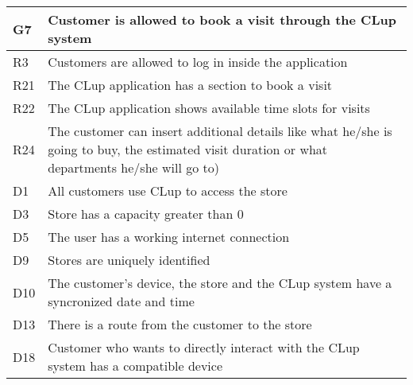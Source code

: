 \begin{center}
    {\renewcommand{\arraystretch}{1.5}
    \begin{longtable}{L{2cm}L{12cm}}
        \hline
        \textbf{G7} & \textbf{Customer is allowed to book a visit through the CLup system} \\
        \hline
         R3 & Customers are allowed to log in inside the application \\
        \hline
         R21 & The CLup application has a section to book a visit \\
        \hline
         R22 & The CLup application shows available time slots for visits \\
        \hline
         R24 & The customer can insert additional details like what he/she is going to buy, the estimated visit duration or what departments he/she will go to) \\
        \hline
         D1 & All customers use CLup to access the store \\
        \hline
         D3 & Store has a capacity greater than 0 \\
        \hline
         D5 & The user has a working internet connection \\
        \hline
         D9 & Stores are uniquely identified \\
        \hline
         D10 & The customer’s device, the store and the CLup system have a syncronized date and time \\
        \hline
         D13 & There is a route from the customer to the store \\
        \hline
         D18 & Customer who wants to directly interact with the CLup system has a compatible device \\
        \hline
    \end{longtable}}


\end{center}
